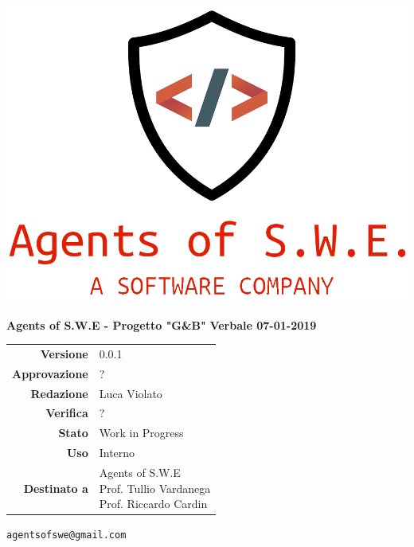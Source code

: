 


\begin{titlepage}
\thispagestyle{empty}

\begin{center}


\includegraphics[scale=0.3]{./images/logo.png} 


\large \textbf{Agents of S.W.E - Progetto "G\&B"}
\vfill
\Huge \textbf{Verbale 07-01-2019}
\vfill
\large
\renewcommand{\arraystretch}{1.3}
\begin{tabular}{r|l}
\textbf{Versione} & 0.0.1\\
\textbf{Approvazione} & ?\\
\textbf{Redazione} & \parbox[t]{5cm}{Luca Violato}\\
\textbf{Verifica} & \parbox[t]{5cm}{?}\\
\textbf{Stato} & Work in Progress\\
\textbf{Uso} & Interno\\
\textbf{Destinato a} & \parbox[t]{5cm}{Agents of S.W.E \\Prof. Tullio Vardanega\\Prof. Riccardo Cardin}
\end{tabular}
\vfill
\small
\texttt{agentsofswe@gmail.com}
\end{center}
\end{titlepage}

\pagebreak



	











